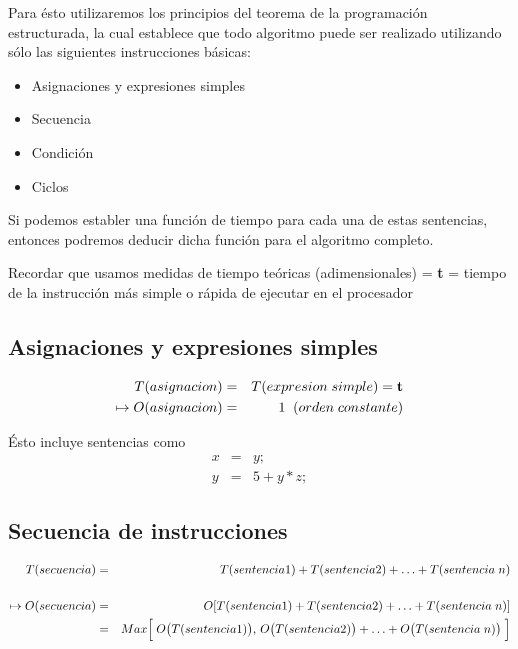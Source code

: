 Para ésto utilizaremos los principios del teorema de la programación
estructurada, la cual establece que todo algoritmo puede ser realizado
utilizando sólo las siguientes instrucciones básicas:

\begin{itemize}
\item Asignaciones y expresiones simples
\item Secuencia
\item Condición
\item Ciclos
\end{itemize}

Si podemos establer una función de tiempo para cada una de estas
sentencias, entonces podremos deducir dicha función para el algoritmo
completo.

Recordar que usamos medidas de tiempo teóricas (adimensionales) =
\textbf{t} = tiempo de la instrucción más simple o rápida de ejecutar
en el procesador

\subsection{ Asignaciones y expresiones simples}
\label{sec:asign-y-expr}

\begin{eqnarray*}
T(asignacion) &=& T(expresion \; simple) = {\bf t}\\
\mapsto O(asignacion) &=& 1 \;\;  ( orden \;constante )
\end{eqnarray*}

Ésto incluye sentencias como
\begin{eqnarray*}
  \label{eq:1}
  x& =& y ;\\
  y &=& 5 + y * z ;
\end{eqnarray*}

\subsection{Secuencia de instrucciones}
\label{sec:secu-de-instr}

\begin{eqnarray*}
  T(secuencia) &=& T (sentencia1) + T (sentencia2) + \ldots +T(sentencia \;n)\\
  \\
  \mapsto O(secuencia) &=& O[T (sentencia1) + T (sentencia2) +\ldots+ T(sentencia \;n) ]\\
  &=& Max\Bigl[\;O\bigl(T (sentencia1)\bigr),\, O\bigl(T (sentencia2)\bigr) +\ldots+ O\bigl(T(sentencia\; n)\bigr) \;\Bigr]
\end{eqnarray*}


